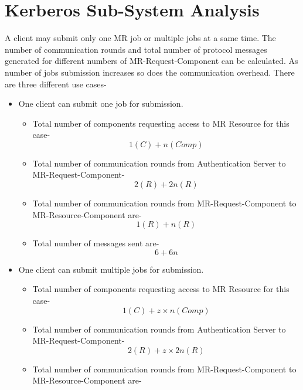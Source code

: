 \documentclass[oneside,a4paper,12pt]{pictreport}
\begin{document}
\section{Kerberos Sub-System Analysis}
\hspace{1.1cm}A client may submit only one MR job or multiple jobs at a same time. The number of communication rounds and total number of protocol messages generated for different numbers of MR-Request-Component can be calculated. As number of jobs submission increases so does the communication overhead. There are three different use cases-
\begin{itemize}
\item One client can submit one job for submission.
\begin{itemize}
\item Total number of components requesting access to MR Resource for this case-
\begin{equation}
1(C) + n(Comp)
\end{equation}
\item Total number of communication rounds from Authentication Server to MR-Request-Component-
\begin{equation}
2(R) + 2n(R)
\end{equation}
\item Total number of communication rounds from MR-Request-Component to MR-Resource-Component are-
\begin{equation}
1(R) + n(R)
\end{equation}
\item Total number of messages sent are-
\begin{equation}
6 + 6n
\end{equation}
\end{itemize}
\item One client can submit multiple jobs for submission.
\begin{itemize}
\item Total number of components requesting access to MR Resource for this case-
\begin{equation}
1(C) + z \times n(Comp)
\end{equation}
\item Total number of communication rounds from Authentication Server to MR-Request-Component-
\begin{equation}
2(R) + z \times 2n(R)
\end{equation}
\item Total number of communication rounds from MR-Request-Component to MR-Resource-Component are-

\end{itemize}
\end{itemize}
\end{document}
